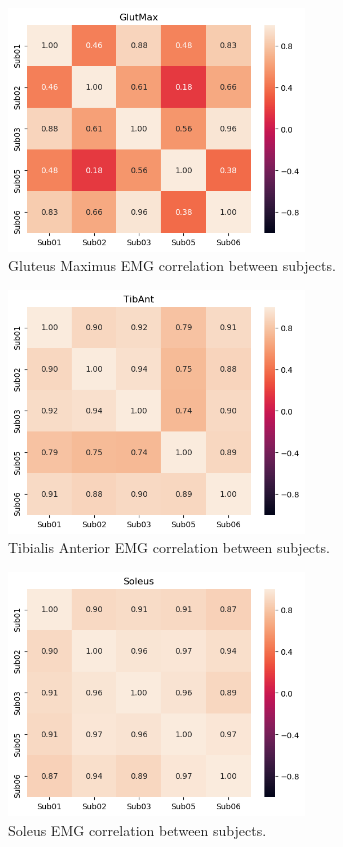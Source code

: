 \begin{figure}[ht!]
    \centering
    \includegraphics[width=0.7\textwidth]{img/results/correlations/GlutMax_correlation_between_subjects.png}
    \caption{Gluteus Maximus \ac{EMG} correlation between subjects.}
    \label{fig:glutmax-correlation}
\end{figure}
\begin{figure}[ht!]
    \centering
    \includegraphics[width=0.7\textwidth]{img/results/correlations/TibAnt_correlation_between_subjects.png}
    \caption{Tibialis Anterior \ac{EMG} correlation between subjects.}
    \label{fig:tibant-correlation}
\end{figure}
\begin{figure}[ht!]
    \centering
    \includegraphics[width=0.7\textwidth]{img/results/correlations/Soleus_correlation_between_subjects.png}
    \caption{Soleus \ac{EMG} correlation between subjects.}
    \label{fig:soleus-correlation}
\end{figure}

